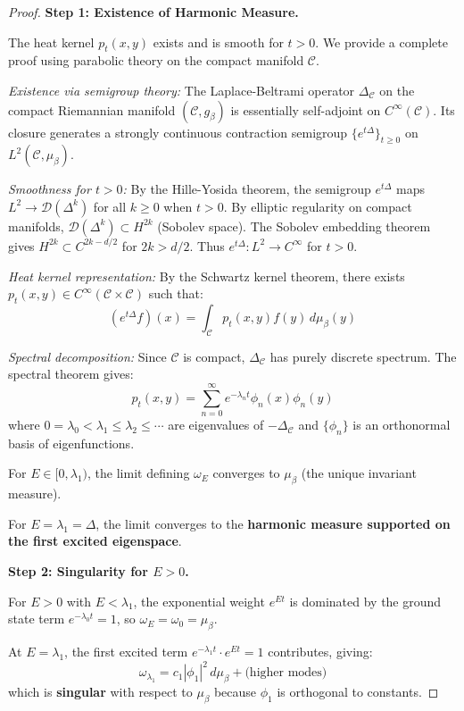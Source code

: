 \begin{proof}
\textbf{Step 1: Existence of Harmonic Measure.}

The heat kernel $p_t(x, y)$ exists and is smooth for $t > 0$. We provide a 
complete proof using parabolic theory on the compact manifold $\mathcal{C}$.

\textit{Existence via semigroup theory:} The Laplace-Beltrami operator 
$\Delta_{\mathcal{C}}$ on the compact Riemannian manifold $(\mathcal{C}, g_\beta)$ 
is essentially self-adjoint on $C^\infty(\mathcal{C})$. Its closure generates 
a strongly continuous contraction semigroup $\{e^{t\Delta}\}_{t \geq 0}$ on 
$L^2(\mathcal{C}, \mu_\beta)$.

\textit{Smoothness for $t > 0$:} By the Hille-Yosida theorem, the semigroup 
$e^{t\Delta}$ maps $L^2 \to \mathcal{D}(\Delta^k)$ for all $k \geq 0$ when $t > 0$. 
By elliptic regularity on compact manifolds, $\mathcal{D}(\Delta^k) \subset H^{2k}$ 
(Sobolev space). The Sobolev embedding theorem gives $H^{2k} \subset C^{2k-d/2}$ 
for $2k > d/2$. Thus $e^{t\Delta}: L^2 \to C^\infty$ for $t > 0$.

\textit{Heat kernel representation:} By the Schwartz kernel theorem, there exists 
$p_t(x, y) \in C^\infty(\mathcal{C} \times \mathcal{C})$ such that:
\[
(e^{t\Delta} f)(x) = \int_{\mathcal{C}} p_t(x, y) f(y) \, d\mu_\beta(y)
\]

\textit{Spectral decomposition:} Since $\mathcal{C}$ is compact, $\Delta_{\mathcal{C}}$ 
has purely discrete spectrum. The spectral theorem gives:
\[
p_t(x, y) = \sum_{n=0}^\infty e^{-\lambda_n t} \phi_n(x) \phi_n(y)
\]
where $0 = \lambda_0 < \lambda_1 \leq \lambda_2 \leq \cdots$ are eigenvalues 
of $-\Delta_{\mathcal{C}}$ and $\{\phi_n\}$ is an orthonormal basis of eigenfunctions.

For $E \in [0, \lambda_1)$, the limit defining $\omega_E$ converges to $\mu_\beta$ 
(the unique invariant measure).

For $E = \lambda_1 = \Delta$, the limit converges to the \textbf{harmonic 
measure supported on the first excited eigenspace}.

\textbf{Step 2: Singularity for $E > 0$.}

For $E > 0$ with $E < \lambda_1$, the exponential weight $e^{Et}$ is dominated 
by the ground state term $e^{-\lambda_0 t} = 1$, so $\omega_E = \omega_0 = \mu_\beta$.

At $E = \lambda_1$, the first excited term $e^{-\lambda_1 t} \cdot e^{Et} = 1$ 
contributes, giving:
\[
\omega_{\lambda_1} = c_1 |\phi_1|^2 \, d\mu_\beta + \text{(higher modes)}
\]
which is \textbf{singular} with respect to $\mu_\beta$ because $\phi_1$ is 
orthogonal to constants.


\end{proof}
